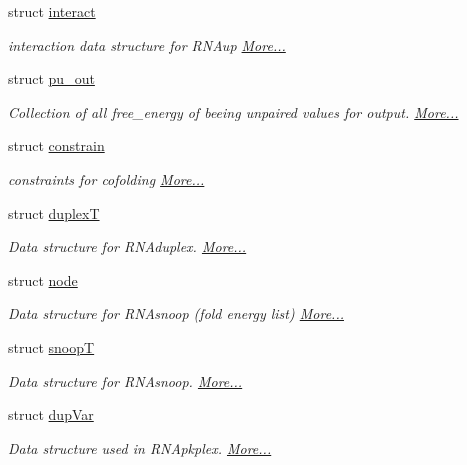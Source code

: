 \begin{DoxyCompactItemize}
struct \mbox{\hyperlink{group__data__structures_structinteract}{interact}}
\begin{DoxyCompactList}\small\item\em interaction data structure for R\+N\+Aup  \mbox{\hyperlink{group__data__structures_structinteract}{More...}}\end{DoxyCompactList}\item 
struct \mbox{\hyperlink{group__data__structures_structpu__out}{pu\+\_\+out}}
\begin{DoxyCompactList}\small\item\em Collection of all free\+\_\+energy of beeing unpaired values for output.  \mbox{\hyperlink{group__data__structures_structpu__out}{More...}}\end{DoxyCompactList}\item 
struct \mbox{\hyperlink{group__data__structures_structconstrain}{constrain}}
\begin{DoxyCompactList}\small\item\em constraints for cofolding  \mbox{\hyperlink{group__data__structures_structconstrain}{More...}}\end{DoxyCompactList}\item 
struct \mbox{\hyperlink{group__data__structures_structduplex_t}{duplexT}}
\begin{DoxyCompactList}\small\item\em Data structure for R\+N\+Aduplex.  \mbox{\hyperlink{group__data__structures_structduplex_t}{More...}}\end{DoxyCompactList}\item 
struct \mbox{\hyperlink{group__data__structures_structnode}{node}}
\begin{DoxyCompactList}\small\item\em Data structure for R\+N\+Asnoop (fold energy list)  \mbox{\hyperlink{group__data__structures_structnode}{More...}}\end{DoxyCompactList}\item 
struct \mbox{\hyperlink{group__data__structures_structsnoop_t}{snoopT}}
\begin{DoxyCompactList}\small\item\em Data structure for R\+N\+Asnoop.  \mbox{\hyperlink{group__data__structures_structsnoop_t}{More...}}\end{DoxyCompactList}\item 
struct \mbox{\hyperlink{group__data__structures_structdup_var}{dup\+Var}}
\begin{DoxyCompactList}\small\item\em Data structure used in R\+N\+Apkplex.  \mbox{\hyperlink{group__data__structures_structdup_var}{More...}}\end{DoxyCompactList}\end{DoxyCompactItemize}
